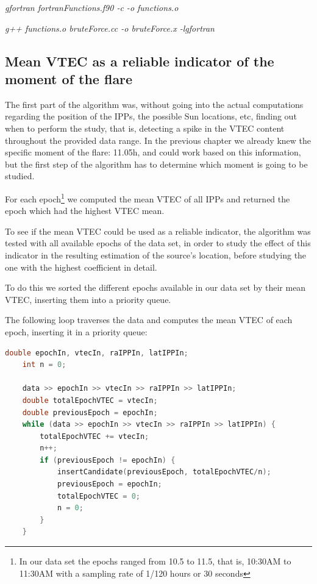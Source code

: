 \textit{gfortran fortranFunctions.f90 -c -o functions.o}
	
\textit{g++ functions.o bruteForce.cc -o bruteForce.x -lgfortran}

\subsection{Mean VTEC as a reliable indicator of the moment of the flare}

The first part of the algorithm was, without going into the actual computations regarding the position of the IPPs, the possible Sun locations, etc, finding out when to perform the study, that is, detecting a spike in the VTEC content throughout the provided data range. 
In the previous chapter we already knew the specific moment of the flare: 11.05h, and could work based on this information, but the first step of the algorithm has to determine which moment is going to be studied.

For each epoch\footnote{In our data set the epochs ranged from 10.5 to 11.5, that is, 10:30AM to 11:30AM with a sampling rate of 1/120 hours or 30 seconds} we computed the mean VTEC of all IPPs and returned the epoch which had the highest VTEC mean.

To see if the mean VTEC could be used as a reliable indicator, the algorithm was tested with all available epochs of the data set, in order to study the effect of this indicator in the resulting estimation of the source's location, before studying the one with the highest coefficient in detail.

To do this we sorted the different epochs available in our data set by their mean VTEC, inserting them into a priority queue.

The following loop traverses the data and computes the mean VTEC of each epoch, inserting it in a priority queue:

\begin{minipage}{\linewidth}
	\begin{lstlisting}[language=c, caption=Finding a VTEC spike]
	double epochIn, vtecIn, raIPPIn, latIPPIn;
	int n = 0;
	
	data >> epochIn >> vtecIn >> raIPPIn >> latIPPIn;
	double totalEpochVTEC = vtecIn;
	double previousEpoch = epochIn;
	while (data >> epochIn >> vtecIn >> raIPPIn >> latIPPIn) {
		totalEpochVTEC += vtecIn;
		n++;
		if (previousEpoch != epochIn) {
			insertCandidate(previousEpoch, totalEpochVTEC/n);
			previousEpoch = epochIn;
			totalEpochVTEC = 0;
			n = 0;
		}
	}\end{lstlisting}
\end{minipage}


